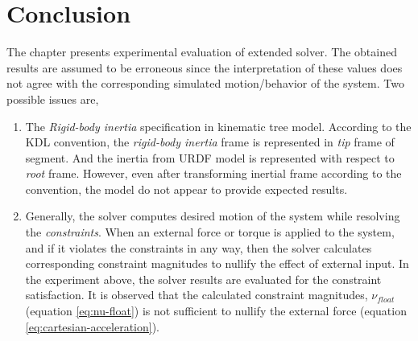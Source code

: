 \section{Conclusion}
The chapter presents experimental evaluation of extended solver. The obtained results are assumed to be erroneous since the interpretation of these values does not agree with the corresponding  simulated motion/behavior of the system. Two possible issues are,

\begin{enumerate}
	\item The \textit{Rigid-body inertia} specification in kinematic tree model. According to the KDL convention, the \textit{rigid-body inertia} frame is represented in \textit{tip} frame of segment. And the inertia from URDF model is represented with respect to \textit{root} frame. However, even after transforming inertial frame according to the convention, the model do not appear to provide expected results.
	\item Generally, the solver computes desired motion of the system while resolving the \textit{constraints}. When an external force or torque is applied to the system, and if it violates the constraints in any way, then the solver calculates corresponding constraint magnitudes to nullify the effect of external input. In the experiment above, the solver results are evaluated for the constraint satisfaction. It is observed that the calculated constraint magnitudes, $\nu_{float}$ (equation \ref{eq:nu-float}) is not sufficient to nullify the external force (equation \ref{eq:cartesian-acceleration}). 
\end{enumerate}  

%






%




















